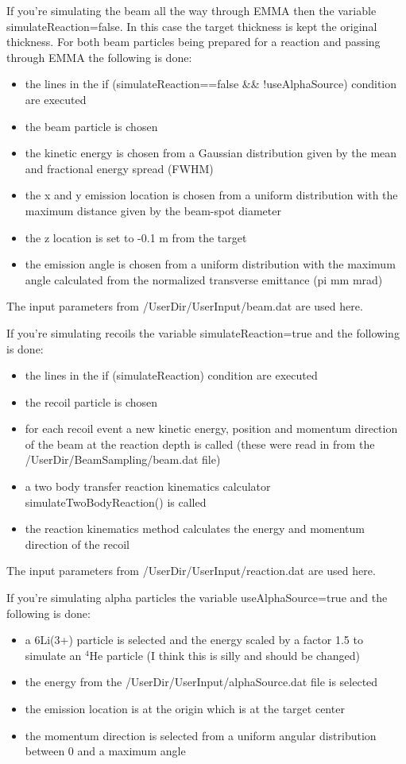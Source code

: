 \documentclass[letter,12pt]{article}
\newcommand{\filefont}[1]{{\fontfamily{pnc}\selectfont #1}\xspace}
\begin{document}
If you're simulating the beam all the way through EMMA then the variable \filefont{simulateReaction=false}. In this case the target thickness is kept the original thickness. For both beam particles being prepared for a reaction and passing through EMMA the following is done:
\begin{itemize}
\item the lines in the \filefont{if (simulateReaction==false \&\& !useAlphaSource)} condition are executed
\item the beam particle is chosen
\item the kinetic energy is chosen from a Gaussian distribution given by the mean and fractional energy spread (FWHM)
\item the x and y emission location is chosen from a uniform distribution with the maximum distance given by the beam-spot diameter
\item the z location is set to -0.1 m from the target
\item the emission angle is chosen from a uniform distribution with the maximum angle calculated from the normalized transverse emittance (pi mm mrad)
\end{itemize}
The input parameters from \filefont{/UserDir/UserInput/beam.dat} are used here.

If you're simulating recoils the variable \filefont{simulateReaction=true} and the following is done:
\begin{itemize}
\item the lines in the \filefont{if (simulateReaction)} condition are executed
\item the recoil particle is chosen
\item for each recoil event a new kinetic energy, position and momentum direction of the beam at the reaction depth is called (these were read in from the \filefont{/UserDir/BeamSampling/beam.dat} file)
\item a two body transfer reaction kinematics calculator \filefont{simulateTwoBodyReaction()} is called
\item the reaction kinematics method calculates the energy and momentum direction of the recoil
\end{itemize}
The input parameters from \filefont{/UserDir/UserInput/reaction.dat} are used here.

If you're simulating alpha particles the variable \filefont{useAlphaSource=true} and the following is done:
\begin{itemize}
\item a 6Li(3+) particle is selected and the energy scaled by a factor 1.5 to simulate an $^{4}$He particle (I think this is silly and should be changed)
\item the energy from the \filefont{/UserDir/UserInput/alphaSource.dat} file is selected
\item the emission location is at the origin which is at the target center
\item the momentum direction is selected from a uniform angular distribution between 0 and a maximum angle
\end{itemize}
\end{document}
